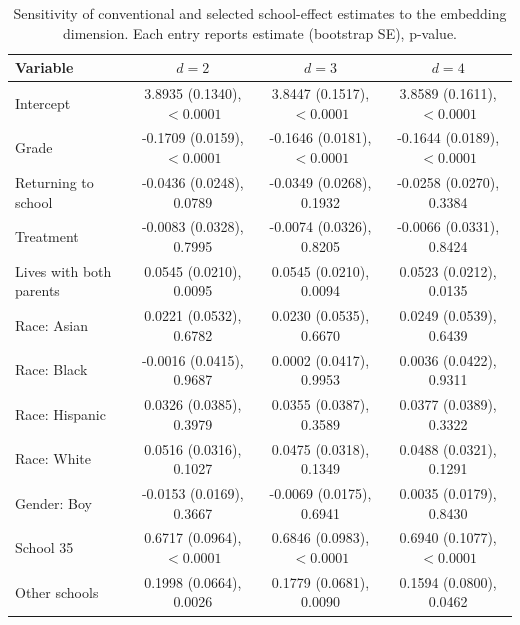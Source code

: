 \begin{table}[ht]
\centering
\small
\caption{Sensitivity of conventional and selected school-effect estimates to the embedding dimension. Each entry reports estimate (bootstrap SE), p-value.}
\label{tab:real-data-dimension-sensitivity}
\begin{tabular}{lccc}
\toprule
Variable & $d=2$ & $d=3$ & $d=4$ \\
\midrule
Intercept & 3.8935 (0.1340), $<0.0001$ & 3.8447 (0.1517), $<0.0001$ & 3.8589 (0.1611), $<0.0001$ \\
Grade & -0.1709 (0.0159), $<0.0001$ & -0.1646 (0.0181), $<0.0001$ & -0.1644 (0.0189), $<0.0001$ \\
Returning to school & -0.0436 (0.0248), 0.0789 & -0.0349 (0.0268), 0.1932 & -0.0258 (0.0270), 0.3384 \\
Treatment & -0.0083 (0.0328), 0.7995 & -0.0074 (0.0326), 0.8205 & -0.0066 (0.0331), 0.8424 \\
Lives with both parents & 0.0545 (0.0210), 0.0095 & 0.0545 (0.0210), 0.0094 & 0.0523 (0.0212), 0.0135 \\
Race: Asian & 0.0221 (0.0532), 0.6782 & 0.0230 (0.0535), 0.6670 & 0.0249 (0.0539), 0.6439 \\
Race: Black & -0.0016 (0.0415), 0.9687 & 0.0002 (0.0417), 0.9953 & 0.0036 (0.0422), 0.9311 \\
Race: Hispanic & 0.0326 (0.0385), 0.3979 & 0.0355 (0.0387), 0.3589 & 0.0377 (0.0389), 0.3322 \\
Race: White & 0.0516 (0.0316), 0.1027 & 0.0475 (0.0318), 0.1349 & 0.0488 (0.0321), 0.1291 \\
Gender: Boy & -0.0153 (0.0169), 0.3667 & -0.0069 (0.0175), 0.6941 & 0.0035 (0.0179), 0.8430 \\
School 35 & 0.6717 (0.0964), $<0.0001$ & 0.6846 (0.0983), $<0.0001$ & 0.6940 (0.1077), $<0.0001$ \\
Other schools & 0.1998 (0.0664), 0.0026 & 0.1779 (0.0681), 0.0090 & 0.1594 (0.0800), 0.0462 \\
\bottomrule
\end{tabular}
\end{table}
